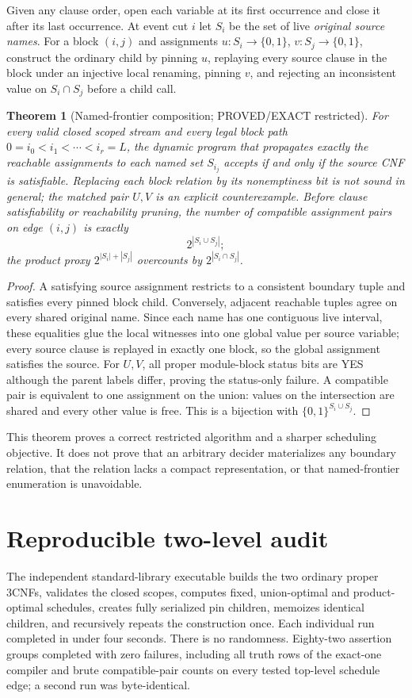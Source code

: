 \documentclass[11pt]{article}
\newtheorem{theorem}{Theorem}
\begin{document}
Given any clause order, open each variable at its first occurrence and close
it after its last occurrence.  At event cut $i$ let $S_i$ be the set of live
\emph{original source names}.  For a block $(i,j)$ and assignments
$u:S_i\to\{0,1\}$, $v:S_j\to\{0,1\}$, construct the ordinary child by
pinning $u$, replaying every source clause in the block under an injective
local renaming, pinning $v$, and rejecting an inconsistent value on
$S_i\cap S_j$ before a child call.

\begin{theorem}[Named-frontier composition; PROVED/EXACT restricted]
For every valid closed scoped stream and every legal block path
$0=i_0<i_1<\cdots<i_r=L$, the dynamic program that propagates exactly the
reachable assignments to each named set $S_{i_j}$ accepts if and only if the
source CNF is satisfiable.  Replacing each block relation by its nonemptiness
bit is not sound in general; the matched pair $U,V$ is an explicit
counterexample.  Before clause satisfiability or reachability pruning, the
number of compatible assignment pairs on edge $(i,j)$ is exactly
\[
 2^{|S_i\cup S_j|};
\]
the product proxy $2^{|S_i|+|S_j|}$ overcounts by
$2^{|S_i\cap S_j|}$.
\end{theorem}
\begin{proof}
A satisfying source assignment restricts to a consistent boundary tuple and
satisfies every pinned block child.  Conversely, adjacent reachable tuples
agree on every shared original name.  Since each name has one contiguous live
interval, these equalities glue the local witnesses into one global value per
source variable; every source clause is replayed in exactly one block, so the
global assignment satisfies the source.  For $U,V$, all proper module-block
status bits are YES although the parent labels differ, proving the status-only
failure.  A compatible pair is equivalent to one assignment on the union:
values on the intersection are shared and every other value is free.  This is
a bijection with $\{0,1\}^{S_i\cup S_j}$.
\end{proof}

This theorem proves a correct restricted algorithm and a sharper scheduling
objective.  It does not prove that an arbitrary decider materializes any
boundary relation, that the relation lacks a compact representation, or that
named-frontier enumeration is unavoidable.

\section{Reproducible two-level audit}
The independent standard-library executable builds the two ordinary proper
3CNFs, validates the closed scopes, computes fixed, union-optimal and
product-optimal schedules, creates fully serialized pin children, memoizes
identical children, and recursively repeats the construction once.  Each
individual run completed in under four seconds.  There is no randomness.
Eighty-two assertion groups completed with zero failures, including all truth
rows of the exact-one compiler and brute compatible-pair counts on every
tested top-level schedule edge; a second
run was byte-identical.
\end{document}
